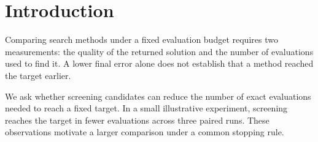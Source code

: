 \documentclass[11pt]{article}
\begin{document}
\section*{Introduction}
Comparing search methods under a fixed evaluation budget requires two measurements: the quality of the returned solution and the number of evaluations used to find it. A lower final error alone does not establish that a method reached the target earlier.

We ask whether screening candidates can reduce the number of exact evaluations needed to reach a fixed target. In a small illustrative experiment, screening reaches the target in fewer evaluations across three paired runs. These observations motivate a larger comparison under a common stopping rule.
\end{document}
